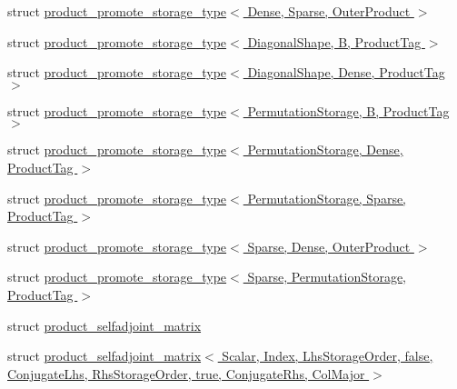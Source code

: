 \begin{DoxyCompactItemize}
\item 
struct \hyperlink{struct_eigen_1_1internal_1_1product__promote__storage__type_3_01_dense_00_01_sparse_00_01_outer_product_01_4}{product\+\_\+promote\+\_\+storage\+\_\+type$<$ Dense, Sparse, Outer\+Product $>$}
\item 
struct \hyperlink{struct_eigen_1_1internal_1_1product__promote__storage__type_3_01_diagonal_shape_00_01_b_00_01_product_tag_01_4}{product\+\_\+promote\+\_\+storage\+\_\+type$<$ Diagonal\+Shape, B, Product\+Tag $>$}
\item 
struct \hyperlink{struct_eigen_1_1internal_1_1product__promote__storage__type_3_01_diagonal_shape_00_01_dense_00_01_product_tag_01_4}{product\+\_\+promote\+\_\+storage\+\_\+type$<$ Diagonal\+Shape, Dense, Product\+Tag $>$}
\item 
struct \hyperlink{struct_eigen_1_1internal_1_1product__promote__storage__type_3_01_permutation_storage_00_01_b_00_01_product_tag_01_4}{product\+\_\+promote\+\_\+storage\+\_\+type$<$ Permutation\+Storage, B, Product\+Tag $>$}
\item 
struct \hyperlink{struct_eigen_1_1internal_1_1product__promote__storage__type_3_01_permutation_storage_00_01_dense_00_01_product_tag_01_4}{product\+\_\+promote\+\_\+storage\+\_\+type$<$ Permutation\+Storage, Dense, Product\+Tag $>$}
\item 
struct \hyperlink{struct_eigen_1_1internal_1_1product__promote__storage__type_3_01_permutation_storage_00_01_sparse_00_01_product_tag_01_4}{product\+\_\+promote\+\_\+storage\+\_\+type$<$ Permutation\+Storage, Sparse, Product\+Tag $>$}
\item 
struct \hyperlink{struct_eigen_1_1internal_1_1product__promote__storage__type_3_01_sparse_00_01_dense_00_01_outer_product_01_4}{product\+\_\+promote\+\_\+storage\+\_\+type$<$ Sparse, Dense, Outer\+Product $>$}
\item 
struct \hyperlink{struct_eigen_1_1internal_1_1product__promote__storage__type_3_01_sparse_00_01_permutation_storage_00_01_product_tag_01_4}{product\+\_\+promote\+\_\+storage\+\_\+type$<$ Sparse, Permutation\+Storage, Product\+Tag $>$}
\item 
struct \hyperlink{struct_eigen_1_1internal_1_1product__selfadjoint__matrix}{product\+\_\+selfadjoint\+\_\+matrix}
\item 
struct \hyperlink{struct_eigen_1_1internal_1_1product__selfadjoint__matrix_3_01_scalar_00_01_index_00_01_lhs_storadd08b9e76d992b3a954c3041feed2ed9}{product\+\_\+selfadjoint\+\_\+matrix$<$ Scalar, Index, Lhs\+Storage\+Order, false, Conjugate\+Lhs, Rhs\+Storage\+Order, true, Conjugate\+Rhs, Col\+Major $>$}

\end{DoxyCompactItemize}
